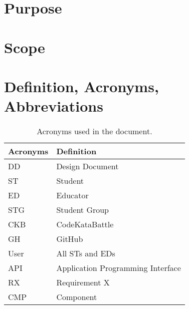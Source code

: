 \section{Purpose}
\label{sec:purpose}%

\section{Scope}
\label{sec:scope}%

\section{Definition, Acronyms, Abbreviations}
\label{sec:definition_acronyms_abbreviations}%

\begin{table}[H]
    \begin{center}
        \begin{tabular}{ |l|l| }
            \hline
            \textbf{Acronyms} & \textbf{Definition}                              \\
            \hline
            DD             & Design Document                      \\
            \hline
            ST              & Student                         \\
            \hline
            ED              & Educator                         \\
            \hline
            STG             & Student Group                    \\
            \hline
            CKB             & CodeKataBattle                   \\
            \hline
            GH              & GitHub                           \\
            \hline
            User            & All STs and EDs                           \\
            \hline
            API             & Application Programming Interface       \\
            \hline
            RX              & Requirement X                           \\
            \hline
            CMP            & Component                           \\
            \hline
         \end{tabular}
        \caption{Acronyms used in the document.}
        \label{tab:acronyms}%
    \end{center}
\end{table}

